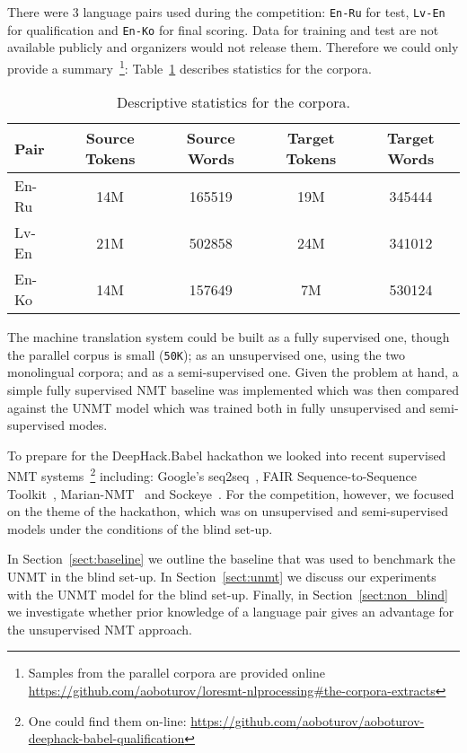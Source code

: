 \documentclass[]{article}
\begin{document}
There were 3 language pairs used during the competition: {\tt En-Ru} for test, {\tt Lv-En} for qualification and {\tt En-Ko} for final scoring.
Data for training and test are not available publicly and organizers would not release them.
Therefore we could only provide a summary~\footnote{Samples from the parallel corpora are provided online \url{https://github.com/aoboturov/loresmt-nlprocessing\#the-corpora-extracts}}: Table~\ref{table:corpora_stats} describes statistics for the corpora.

\begin{table}[h!]
\begin{center}
\begin{tabular}{ l c c c c }
Pair & Source Tokens & Source Words & Target Tokens & Target Words \\
\hline
En-Ru & 14M & 165519 & 19M & 345444 \\
Lv-En & 21M & 502858 & 24M & 341012 \\
En-Ko & 14M & 157649 & 7M & 530124 \\
\end{tabular}
\end{center}
\caption{Descriptive statistics for the corpora.}
\label{table:corpora_stats}
\end{table}

The machine translation system could be built as a fully supervised one, though the parallel corpus is small ({\tt 50K}); as an unsupervised one, using the two monolingual corpora; and as a semi-supervised one.
Given the problem at hand, a simple fully supervised \ac{NMT} baseline was implemented which was then compared against the \ac{UNMT} model which was trained both in fully unsupervised and semi-supervised modes.

To prepare for the {{DeepHack.Babel}} hackathon we looked into recent supervised \ac{NMT} systems~\footnote{One could find them on-line: \url{https://github.com/aoboturov/aoboturov-deephack-babel-qualification}} including: Google's seq2seq~\citep{Britz:2017}, {FAIR Sequence-to-Sequence Toolkit}~\citep{gehring2017convs2s}, {{Marian-NMT}}~\citep{junczys2016neural} and Sockeye~\citep{Sockeye:17}.
For the competition, however, we focused on the theme of the hackathon, which was on unsupervised and semi-supervised models under the conditions of the blind set-up.

In Section~\ref{sect:baseline} we outline the baseline that was used to benchmark the \ac{UNMT} in the blind set-up.
In Section~\ref{sect:unmt} we discuss our experiments with the \ac{UNMT} model for the blind set-up.
Finally, in Section~\ref{sect:non_blind} we investigate whether prior knowledge of a language pair gives an advantage for the unsupervised \ac{NMT} approach.
\end{document}
